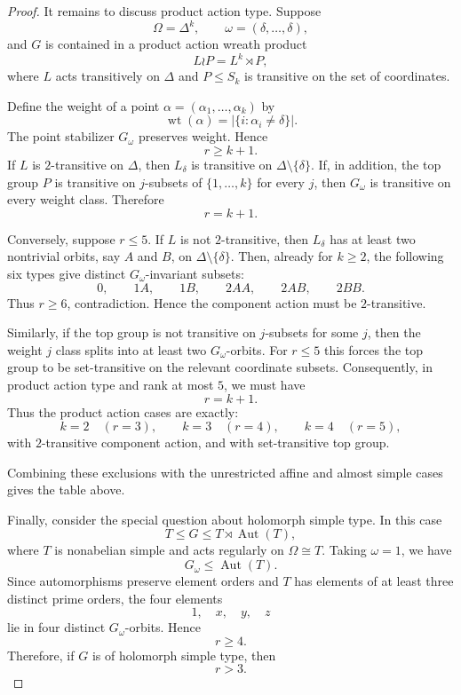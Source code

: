 \begin{proof}
    It remains to discuss product action type. Suppose
    \[
    \Omega=\Delta^k,
    \qquad
    \omega=(\delta,\ldots,\delta),
    \]
    and \(G\) is contained in a product action wreath product
    \[
    L\wr P
    =
    L^k\rtimes P,
    \]
    where \(L\) acts transitively on \(\Delta\) and \(P\leq S_k\) is transitive on the
    set of coordinates.
    
    Define the weight of a point \(\alpha=(\alpha_1,\ldots,\alpha_k)\) by
    \[
    \operatorname{wt}(\alpha)
    =
    |\{i:\alpha_i\neq \delta\}|.
    \]
    The point stabilizer \(G_\omega\) preserves weight. Hence
    \[
    r\geq k+1.
    \]
    If \(L\) is \(2\)-transitive on \(\Delta\), then \(L_\delta\) is transitive on
    \(\Delta\setminus\{\delta\}\). If, in addition, the top group \(P\) is transitive on
    \(j\)-subsets of \(\{1,\ldots,k\}\) for every \(j\), then \(G_\omega\) is transitive
    on every weight class. Therefore
    \[
    r=k+1.
    \]
    
    Conversely, suppose \(r\leq 5\). If \(L\) is not \(2\)-transitive, then
    \(L_\delta\) has at least two nontrivial orbits, say \(A\) and \(B\), on
    \(\Delta\setminus\{\delta\}\). Then, already for \(k\geq 2\), the following six
    types give distinct \(G_\omega\)-invariant subsets:
    \[
    0,\qquad
    1A,\qquad
    1B,\qquad
    2AA,\qquad
    2AB,\qquad
    2BB.
    \]
    Thus \(r\geq 6\), contradiction. Hence the component action must be
    \(2\)-transitive.
    
    Similarly, if the top group is not transitive on \(j\)-subsets for some \(j\), then
    the weight \(j\) class splits into at least two \(G_\omega\)-orbits. For \(r\leq 5\)
    this forces the top group to be set-transitive on the relevant coordinate subsets.
    Consequently, in product action type and rank at most \(5\), we must have
    \[
    r=k+1.
    \]
    Thus the product action cases are exactly:
    \[
    k=2 \quad (r=3),\qquad
    k=3 \quad (r=4),\qquad
    k=4 \quad (r=5),
    \]
    with \(2\)-transitive component action, and with set-transitive top group.
    
    Combining these exclusions with the unrestricted affine and almost simple cases gives
    the table above.
    
    Finally, consider the special question about holomorph simple type. In this case
    \[
    T\leq G\leq T\rtimes \operatorname{Aut}(T),
    \]
    where \(T\) is nonabelian simple and acts regularly on \(\Omega\cong T\). Taking
    \(\omega=1\), we have
    \[
    G_\omega\leq \operatorname{Aut}(T).
    \]
    Since automorphisms preserve element orders and \(T\) has elements of at least three
    distinct prime orders, the four elements
    \[
    1,\quad x,\quad y,\quad z
    \]
    lie in four distinct \(G_\omega\)-orbits. Hence
    \[
    r\geq 4.
    \]
    Therefore, if \(G\) is of holomorph simple type, then
    \[
    \boxed{r>3.}
    \]
    

\end{proof}
